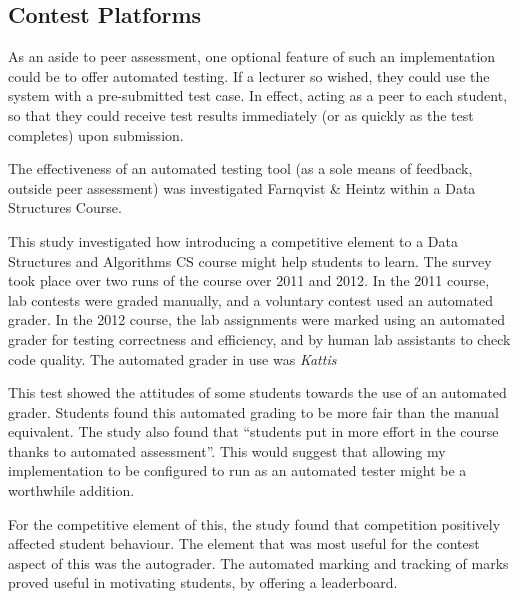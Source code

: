 \documentclass[a4paper,11pt]{report}
\begin{document}
\subsection{Contest Platforms}
As an aside to peer assessment, one optional feature of such an implementation could be to offer automated testing. If a lecturer so wished, they could use the system with a pre-submitted test case. In effect, acting as a peer to each student, so that they could receive test results immediately (or as quickly as the test completes) upon submission.\par
The effectiveness of an automated testing tool (as a sole means of feedback, outside peer assessment) was investigated Farnqvist \& Heintz \cite{farnqvist_competition_2016} within a Data Structures Course.\par
This study investigated how introducing a competitive element to a Data Structures and Algorithms CS course might help students to learn. The survey took place over two runs of the course over 2011 and 2012. In the 2011 course, lab contests were graded manually, and a voluntary contest used an automated grader. In the 2012 course, the lab assignments were marked using an automated grader for testing correctness and efficiency, and by human lab assistants to check code quality. The automated grader in use was \textit{Kattis} \cite{enstrom_five_2011}\par
This test showed the attitudes of some students towards the use of an automated grader. Students found this automated grading to be more fair than the manual equivalent. The study also found that ``students put in more effort in the course thanks to automated assessment''. This would suggest that allowing my implementation to be configured to run as an automated tester might be a worthwhile addition.\par
For the competitive element of this, the study found that competition positively affected student behaviour. The element that was most useful for the contest aspect of this was the autograder. The automated marking and tracking of marks proved useful in motivating students, by offering a leaderboard.\par
\end{document}
